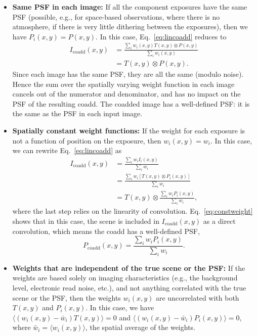 \documentclass[modern]{style_and_logos/lsstdescnote}
\begin{document}
\begin{itemize}
    \item \textbf{Same PSF in each image:} If all the component exposures have the same PSF (possible, e.g., for space-based observations, where there is no atmosphere, if there is very little dithering between the exposures), then we have $P_i(x,y)=P(x,y)$.  In this case, Eq.~\eqref{eq:lincoadd} reduces to
    \begin{align*}
         I_\text{coadd}(x,y) &= \frac{\sum_i w_i(x,y) T(x,y)\otimes P(x,y)}{\sum_i w_i(x,y)} \\
         &= T(x,y)\otimes P(x,y).
    \end{align*}
    Since each image has the same PSF, they are all the same (modulo noise).  Hence the sum over the spatially varying weight function in each image cancels out of the numerator and denominator, and has no impact on the PSF of the resulting coadd.  The coadded image has a well-defined PSF: it is the same as the PSF in each input image.
    
    \item \textbf{Spatially constant weight functions:}  If the weight for each exposure is not a function of position on the exposure, then  $w_i(x,y)=w_i$.  In this case, we can rewrite Eq.~\eqref{eq:lincoadd} as
    \begin{align}
        I_\text{coadd}(x,y) &= \frac{\sum_i w_i I_i(x,y)}{\sum_i w_i} \nonumber\\
        &= \frac{\sum_i w_i \left[T(x,y) \otimes P_i(x,y)\right]}{\sum_i w_i} \nonumber \\
        &= T(x,y) \otimes \frac{\sum_i w_i P_i(x,y)}{\sum_i w_i},\label{eq:constweight}
    \end{align}
    where the last step relies on the linearity of convolution.  
    Eq.~\eqref{eq:constweight} shows that in this case, the scene is included in $I_\text{coadd}(x,y)$ as a direct convolution, which means the coadd has a well-defined PSF, 
    \begin{equation}\label{eq:constweightpsf}
        P_\text{coadd}(x,y) = \frac{\sum_i w_i P_i(x,y)}{\sum_i w_i}.
    \end{equation}

    \item \textbf{Weights that are independent of the true scene or the PSF:}  If the weights are based solely on imaging characteristics (e.g., the background level, electronic read noise, etc.), and not anything correlated with the true scene or the PSF, then the weights $w_i(x,y)$ are uncorrelated with both $T(x,y)$ and $P_i(x,y)$.
    In this case, we have $\langle (w_i(x,y)-\bar w_i) T(x,y) \rangle = 0$ and $\langle (w_i(x,y) - \bar w_i) P_i(x,y) \rangle = 0$, where $\tilde{w_i} = \langle w_i(x,y)\rangle$, the spatial average of the weights.  
    

\end{itemize}
\end{document}
